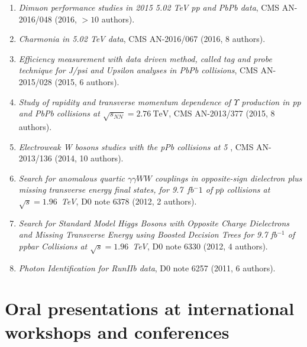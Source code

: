 \documentclass[a4paper,11pt]{article}
\begin{document}
 \begin{enumerate}
 \item 
 \emph{Dimuon performance studies in 2015 5.02 TeV pp and PbPb data}, CMS AN-2016/048 (2016, $>10$ authors).
 \item 
\emph{Charmonia in 5.02 TeV data}, CMS AN-2016/067 (2016, 8 authors).
  \item 
  \emph{Efficiency measurement with data driven method, 
  called tag and probe technique for J/psi and Upsilon analyses in PbPb collisions}, CMS AN-2015/028 (2015, 6 authors).
   \item 
\emph{Study of rapidity and transverse 
momentum dependence of $\Upsilon$ production in pp and PbPb collisions at $\sqrt{s_{NN}} = 2.76~\text{TeV}$}, CMS 
AN-2013/377 (2015, 8 authors).
  \item 
\emph{Electroweak W bosons studies with the pPb collisions at 5 
}, CMS AN-2013/136 (2014, 10 authors).
  \item 
  \emph{Search for anomalous quartic $\gamma \gamma W W$ couplings in opposite-sign dielectron 
plus missing transverse energy final states, for 9.7~fb$^-1$ of $p\bar{p}$ collisions at $\sqrt{s} = 1.96$~TeV}, D0 
note {6378} (2012, 2 authors).
 \item 
 \emph{Search for Standard Model Higgs Bosons with Opposite Charge 
Dielectrons and Missing Transverse Energy using Boosted Decision Trees for 9.7 fb$^{-1}$ of ppbar Collisions at 
$\sqrt{s} = 1.96$~TeV}, D0 note {6330} (2012, 4 authors).
\item 
\emph{Photon Identification 
for RunIIb data}, D0 note {6257} (2011, 6 authors).
 \end{enumerate}

 \section*{Oral presentations at international workshops and conferences}
 
\end{document}
